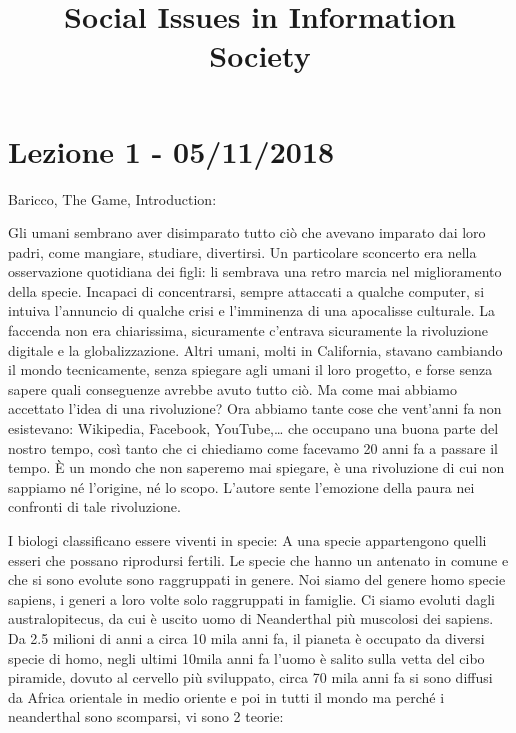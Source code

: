 \documentclass[a4page, 11pt]{article}
\title{Social Issues in Information Society}
\author{}
\date{}
\begin{document}
\maketitle
\tableofcontents
\newpage


\section*{Lezione 1 - 05/11/2018}

Baricco, The Game, Introduction:

Gli umani sembrano aver disimparato tutto ciò che avevano imparato dai
loro padri, come mangiare, studiare, divertirsi. Un particolare
sconcerto era nella osservazione quotidiana dei figli: li sembrava una
retro marcia nel miglioramento della specie. Incapaci di concentrarsi,
sempre attaccati a qualche computer, si intuiva l'annuncio di qualche
crisi e l'imminenza di una apocalisse culturale. La faccenda non era
chiarissima, sicuramente c'entrava sicuramente la rivoluzione digitale e
la globalizzazione. Altri umani, molti in California, stavano cambiando
il mondo tecnicamente, senza spiegare agli umani il loro progetto, e
forse senza sapere quali conseguenze avrebbe avuto tutto ciò. Ma come
mai abbiamo accettato l'idea di una rivoluzione? Ora abbiamo tante cose
che vent'anni fa non esistevano: Wikipedia, Facebook, YouTube,\ldots{}
che occupano una buona parte del nostro tempo, così tanto che ci
chiediamo come facevamo 20 anni fa a passare il tempo. È un mondo che
non saperemo mai spiegare, è una rivoluzione di cui non sappiamo né
l'origine, né lo scopo. L'autore sente l'emozione della paura nei
confronti di tale rivoluzione.

I biologi classificano essere viventi in specie: A una specie
appartengono quelli esseri che possano riprodursi fertili. Le specie che
hanno un antenato in comune e che si sono evolute sono raggruppati in genere.
Noi siamo del genere homo specie sapiens, i generi a loro volte solo raggruppati
in famiglie. Ci siamo evoluti dagli australopitecus, da cui è uscito uomo
di Neanderthal più muscolosi dei sapiens. Da 2.5 milioni di anni a circa
10 mila anni fa, il pianeta è occupato da diversi specie di homo, negli
ultimi 10mila anni fa l'uomo è salito sulla vetta del cibo piramide,
dovuto al cervello più sviluppato, circa 70 mila anni fa si sono diffusi
da Africa orientale in medio oriente e poi in tutti il mondo ma perché i
neanderthal sono scomparsi, vi sono 2 teorie:
\end{document}
